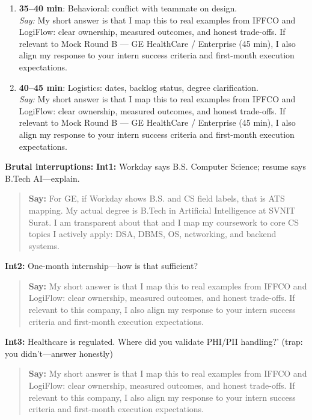\documentclass[9pt,a4paper]{article}
\begin{document}
\begin{enumerate}
  \item \textbf{35--40 min}: Behavioral: conflict with teammate on design.\\
  \textit{Say:} My short answer is that I map this to real examples from IFFCO and LogiFlow: clear ownership, measured outcomes, and honest trade-offs. If relevant to Mock Round B --- GE HealthCare / Enterprise (45 min), I also align my response to your intern success criteria and first-month execution expectations.
  \item \textbf{40--45 min}: Logistics: dates, backlog status, degree clarification.\\
  \textit{Say:} My short answer is that I map this to real examples from IFFCO and LogiFlow: clear ownership, measured outcomes, and honest trade-offs. If relevant to Mock Round B --- GE HealthCare / Enterprise (45 min), I also align my response to your intern success criteria and first-month execution expectations.
\end{enumerate}
\textbf{Brutal interruptions:}
\textbf{Int1:} Workday says B.S. Computer Science; resume says B.Tech AI---explain.

\begin{quote}\small\textbf{Say:} For GE, if Workday shows B.S. and CS field labels, that is ATS mapping. My actual degree is B.Tech in Artificial Intelligence at SVNIT Surat. I am transparent about that and I map my coursework to core CS topics I actively apply: DSA, DBMS, OS, networking, and backend systems.\end{quote}
\vspace{2mm}
\textbf{Int2:} One-month internship---how is that sufficient?

\begin{quote}\small\textbf{Say:} My short answer is that I map this to real examples from IFFCO and LogiFlow: clear ownership, measured outcomes, and honest trade-offs. If relevant to this company, I also align my response to your intern success criteria and first-month execution expectations.\end{quote}
\vspace{2mm}
\textbf{Int3:} Healthcare is regulated. Where did you validate PHI/PII handling?' (trap: you didn't---answer honestly)

\begin{quote}\small\textbf{Say:} My short answer is that I map this to real examples from IFFCO and LogiFlow: clear ownership, measured outcomes, and honest trade-offs. If relevant to this company, I also align my response to your intern success criteria and first-month execution expectations.\end{quote}
\vspace{2mm}
\end{document}
